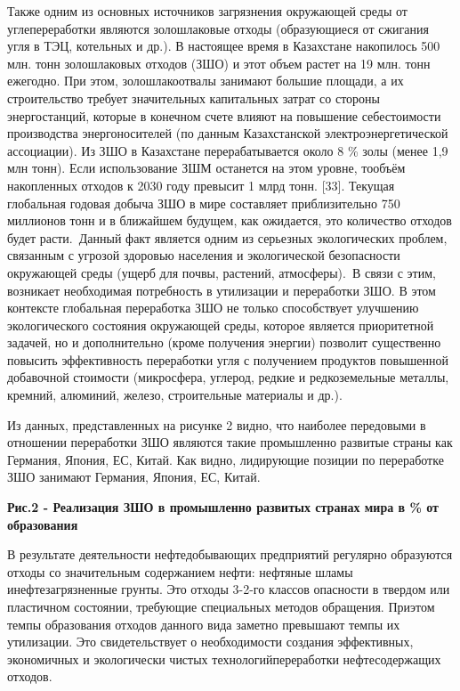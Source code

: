 Также одним из основных источников загрязнения окружающей среды от
углепереработки являются золошлаковые отходы (образующиеся от сжигания
угля в ТЭЦ, котельных и др.). В настоящее время в Казахстане накопилось
500 млн. тонн золошлаковых отходов (ЗШО) и этот объем растет на 19 млн.
тонн ежегодно. При этом, золошлакоотвалы занимают большие площади, а их
строительство требует значительных капитальных затрат со стороны
энергостанций, которые в конечном счете влияют на повышение
себестоимости производства энергоносителей (по данным Казахстанской
электроэнергетической ассоциации). Из ЗШО в Казахстане перерабатывается
около 8 \% золы (менее 1,9 млн тонн). Если использование ЗШМ останется
на этом уровне, тообъём накопленных отходов к 2030 году превысит 1 млрд
тонн. {[}33{]}. Текущая глобальная годовая добыча ЗШО в мире составляет
приблизительно 750 миллионов тонн и в ближайшем будущем, как ожидается,
это количество отходов будет расти.~Данный факт является одним из
серьезных экологических проблем, связанным с угрозой здоровью населения
и экологической безопасности окружающей среды (ущерб для почвы,
растений, атмосферы).~В связи с этим, возникает необходимая потребность
в утилизации и переработки ЗШО. В этом контексте глобальная переработка
ЗШО не только способствует улучшению экологического состояния окружающей
среды, которое является приоритетной задачей, но и дополнительно (кроме
получения энергии) позволит существенно повысить эффективность
переработки угля с получением продуктов повышенной добавочной стоимости
(микросфера, углерод, редкие и редкоземельные металлы, кремний,
алюминий, железо, строительные материалы и др.).

Из данных, представленных на рисунке 2 видно, что наиболее передовыми в
отношении переработки ЗШО являются такие промышленно развитые страны как
Германия, Япония, ЕС, Китай. Как видно, лидирующие позиции по
переработке ЗШО занимают Германия, Япония, ЕС, Китай.

{\bfseries Рис.2 - Реализация ЗШО в промышленно развитых странах мира в \%
от образования}

В результате деятельности нефтедобывающих предприятий регулярно
образуются отходы со значительным содержанием нефти: нефтяные шламы
инефтезагрязненные грунты. Это отходы 3-2-го классов опасности в твердом
или пластичном состоянии, требующие специальных методов обращения.
Приэтом темпы образования отходов данного вида заметно превышают темпы
их утилизации. Это свидетельствует о необходимости создания эффективных,
экономичных и экологически чистых технологийпереработки нефтесодержащих
отходов.

